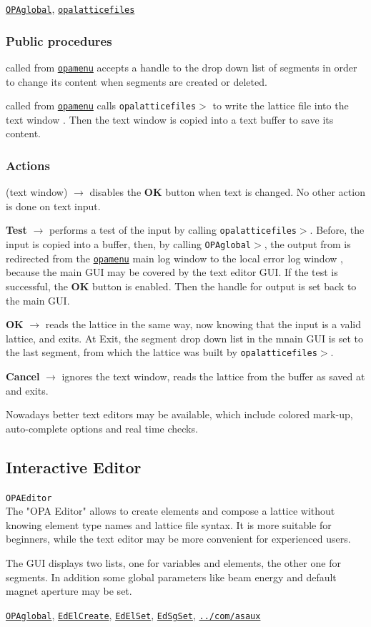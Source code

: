 \documentclass[12pt]{article}
\newcommand\code[1]{{\tt #1}}
\newcommand{\ofld}[1]{\colorbox{black!15}{{\bf #1}}}
\newcommand{\ofldx}[1]{\colorbox{black!15}{(#1)}}
\newcommand\guico[1]{{\color{blue}\code{#1}}}
\newcommand{\unico}[1]{{\color{burntorange}\code{#1}}}
\newcommand{\evcod}[2]{\ofld{#1} $\rightarrow$ \guico{#2}}
\newcommand{\evcodx}[2]{\ofldx{#1} $\rightarrow$ \guico{#2}}
\newcommand{\prcod}[2]{\opauni{#1}$>$\unico{#2}}
\newcommand{\opagui}[1]{\colorbox{blue!20}{\code{#1}}}
\newcommand{\oguih}[2]{\subsection{\label{#2}#1}{\Huge\opagui{#2}}\\}
\newcommand{\ogui}[1]{\hyperref[#1]{\opagui{#1}}}
\newcommand{\opauni}[1]{\colorbox{orange!30}{\code{#1}}}
\newcommand{\ouni}[1]{\hyperref[#1]{\opauni{#1}}}
\newcommand{\uses}[1]{\flushleft {\bf Uses:} #1}
\newcommand{\act}[1]{\subsubsection*{Actions} #1}
\newcommand{\ppro}[1]{\subsubsection*{Public procedures} #1}
\newcommand{\todo}[1]{{\color{red} #1}}
\begin{document}
\uses{\ouni{OPAglobal}, \ouni{opalatticefiles}}

\ppro{
\guico{Init} called from \ogui{opamenu} accepts a handle to the drop down list of segments in order to change its content when segments are created or deleted.

\guico{LoadLattice} called from \ogui{opamenu} calls \prcod{opalatticefiles}{WriteLattice} to write the lattice file into the text window \guico{EdtWin}. Then the text window is copied into a text buffer to save its content.
}

\act{
\evcodx{text window}{disableOKBut} disables the \ofld{OK} button when text is changed. No other action is done on text input.

\evcod{Test}{filetest} performs a test of the input by calling \prcod{opalatticefiles}{LatRead}. Before, the input is copied into a buffer, then, by calling \prcod{OPAglobal}{PassErrLogHandle}, the output from \unico{LatRead} is redirected from the \ogui{opamenu} main log window to the local error log window \guico{myerrlog}, because the main GUI may be covered by the text editor GUI. If the test is successful, the \ofld{OK} button is enabled. Then the handle for output is set back to the main GUI.


\evcod{OK}{fileget} reads the lattice in the same way, now knowing that the input is a valid lattice, and exits. At Exit, the segment drop down list in the mnain GUI is set to the last segment, from which the lattice was built by \prcod{opalatticefiles}{LatRead}.

\evcod{Cancel}{fileRestore} ignores the text window, reads the lattice from the buffer as saved at \guico{Init} and exits.

}

\todo{Nowadays better text editors may be available, which include colored mark-up, auto-complete options and real time checks.}

\oguih{Interactive Editor}{OPAEditor}

The "OPA Editor" allows to create elements and compose a lattice without knowing element type names and lattice file syntax. It is more suitable for beginners, while the text editor may be more convenient for experienced users.

The GUI displays two lists, one for variables and elements, the other one for segments. In addition some global parameters like beam energy and default magnet aperture may be set.

\uses{\ouni{OPAglobal}, \ogui{EdElCreate}, \ogui{EdElSet}, \ogui{EdSgSet}, \ouni{../com/asaux}}
\end{document}
